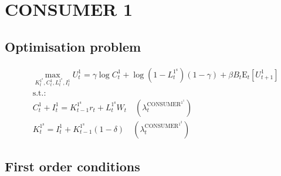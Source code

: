 

\section{CONSUMER 1}

\subsection{Optimisation problem}

\begin{align}
&\max_{K^{\mathrm{1}^{\mathrm{s}}}_{t}, C^{\mathrm{1}}_{t}, L^{\mathrm{1}^{\mathrm{s}}}_{t}, I^{\mathrm{1}}_{t}
} U^{\mathrm{1}}_{t} = {\gamma} {\log{C^{\mathrm{1}}_{t}}} + {\log\left(1 - L^{\mathrm{1}^{\mathrm{s}}}_{t}\right)} \left(1 - \gamma\right) + {\beta} {B_{t}} {\mathrm{E}_{t}\left[U^{\mathrm{1}}_{t+1}\right]}\\
&\mathrm{s.t.:}\nonumber\\
& C^{\mathrm{1}}_{t} + I^{\mathrm{1}}_{t} = {K^{\mathrm{1}^{\mathrm{s}}}_{t-1}} {r_{t}} + {L^{\mathrm{1}^{\mathrm{s}}}_{t}} {W_{t}} \quad \left(\lambda^{\mathrm{CONSUMER}^{\mathrm{1}^{\mathrm{1}}}}_{t}\right)\\
& K^{\mathrm{1}^{\mathrm{s}}}_{t} = I^{\mathrm{1}}_{t} + {K^{\mathrm{1}^{\mathrm{s}}}_{t-1}} \left(1 - \delta\right) \quad \left(\lambda^{\mathrm{CONSUMER}^{\mathrm{1}^{\mathrm{2}}}}_{t}\right)
\end{align}


\subsection{First order conditions}

